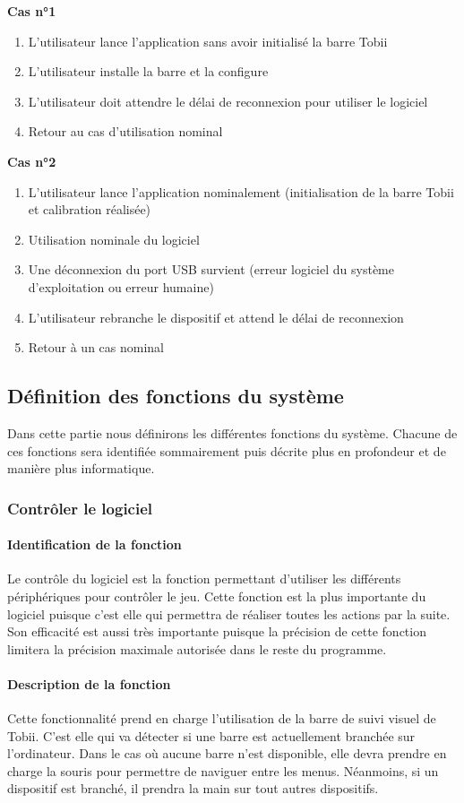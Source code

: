 \documentclass{polytech/polytech}
\begin{document}
\textbf{Cas n°1}
\begin{enumerate}
\item L'utilisateur lance l'application sans avoir initialisé la barre Tobii
\item L'utilisateur installe la barre et la configure
\item L'utilisateur doit attendre le délai de reconnexion pour utiliser le logiciel
\item Retour au cas d'utilisation nominal
\end{enumerate}

\textbf{Cas n°2}
\begin{enumerate}
\item L'utilisateur lance l'application nominalement (initialisation de la barre Tobii et calibration réalisée)
\item Utilisation nominale du logiciel
\item Une déconnexion du port USB survient (erreur logiciel du système d'exploitation ou erreur humaine)
\item L'utilisateur rebranche le dispositif et attend le délai de reconnexion
\item Retour à un cas nominal
\end{enumerate}



\subsection{Définition des fonctions du système}
Dans cette partie nous définirons les différentes fonctions du système. Chacune de ces fonctions sera identifiée sommairement puis décrite plus en profondeur et de manière plus informatique.
\subsubsection{Contrôler le logiciel}
\paragraph{Identification de la fonction}
Le contrôle du logiciel est la fonction permettant d'utiliser les différents périphériques pour contrôler le jeu. Cette fonction est la plus importante du logiciel puisque c'est elle qui permettra de réaliser toutes les actions par la suite. Son efficacité est aussi très importante puisque la précision de cette fonction limitera la précision maximale autorisée dans le reste du programme.

\paragraph{Description de la fonction}
Cette fonctionnalité prend en charge l'utilisation de la barre de suivi visuel de Tobii. C'est elle qui va détecter si une barre est actuellement branchée sur l'ordinateur. Dans le cas où aucune barre n'est disponible, elle devra prendre en charge la souris pour permettre de naviguer entre les menus. Néanmoins, si un dispositif est branché, il prendra la main sur tout autres dispositifs.
\end{document}
